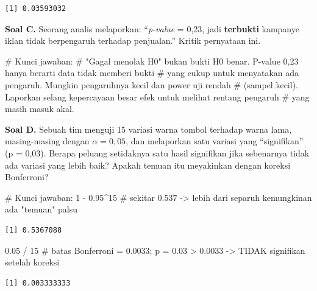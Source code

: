 \documentclass[
  indonesian,
  letterpaper,
]{book}
\newenvironment{Shaded}{\begin{snugshade}}{\end{snugshade}}
\newcommand{\CommentTok}[1]{\textcolor[rgb]{0.37,0.37,0.37}{#1}}
\newcommand{\DecValTok}[1]{\textcolor[rgb]{0.68,0.00,0.00}{#1}}
\newcommand{\FloatTok}[1]{\textcolor[rgb]{0.68,0.00,0.00}{#1}}
\newcommand{\SpecialCharTok}[1]{\textcolor[rgb]{0.37,0.37,0.37}{#1}}
\begin{document}
\begin{verbatim}
[1] 0.03593032
\end{verbatim}

\textbf{Soal C.} Seorang analis melaporkan: ``\emph{p-value} = 0,23,
jadi \textbf{terbukti} kampanye iklan tidak berpengaruh terhadap
penjualan.'' Kritik pernyataan ini.

\begin{Shaded}
\begin{Highlighting}[]
\CommentTok{\# Kunci jawaban:}
\CommentTok{\# "Gagal menolak H0" bukan bukti H0 benar. P{-}value 0,23 hanya berarti data tidak memberi bukti}
\CommentTok{\# yang cukup untuk menyatakan ada pengaruh. Mungkin pengaruhnya kecil dan power uji rendah}
\CommentTok{\# (sampel kecil). Laporkan selang kepercayaan besar efek untuk melihat rentang pengaruh}
\CommentTok{\# yang masih masuk akal.}
\end{Highlighting}
\end{Shaded}

\textbf{Soal D.} Sebuah tim menguji 15 variasi warna tombol terhadap
warna lama, masing-masing dengan \(\alpha = 0{,}05\), dan melaporkan
satu variasi yang ``signifikan'' (p = 0,03). Berapa peluang setidaknya
satu hasil signifikan jika sebenarnya tidak ada variasi yang lebih baik?
Apakah temuan itu meyakinkan dengan koreksi Bonferroni?

\begin{Shaded}
\begin{Highlighting}[]
\CommentTok{\# Kunci jawaban:}
\DecValTok{1} \SpecialCharTok{{-}} \FloatTok{0.95}\SpecialCharTok{\^{}}\DecValTok{15}   \CommentTok{\# sekitar 0.537 {-}\textgreater{} lebih dari separuh kemungkinan ada "temuan" palsu}
\end{Highlighting}
\end{Shaded}

\begin{verbatim}
[1] 0.5367088
\end{verbatim}

\begin{Shaded}
\begin{Highlighting}[]
\FloatTok{0.05} \SpecialCharTok{/} \DecValTok{15}     \CommentTok{\# batas Bonferroni = 0.0033; p = 0.03 \textgreater{} 0.0033 {-}\textgreater{} TIDAK signifikan setelah koreksi}
\end{Highlighting}
\end{Shaded}

\begin{verbatim}
[1] 0.003333333
\end{verbatim}
\end{document}

